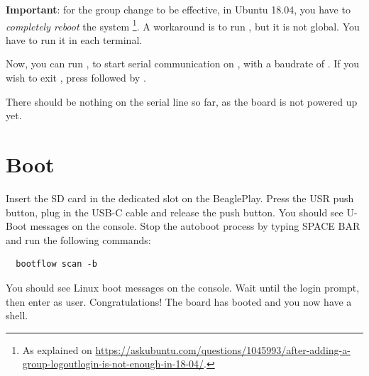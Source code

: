 {\bf Important}: for the group change to be effective, in Ubuntu 18.04, you have to
{\em completely reboot} the system \footnote{As explained on
\url{https://askubuntu.com/questions/1045993/after-adding-a-group-logoutlogin-is-not-enough-in-18-04/}.}.
A workaround is to run , but it is not global.
You have to run it in each terminal.

Now, you can run , to start serial
communication on , with a baudrate of . If
you wish to exit , press \code{[Ctrl][a]} followed by
\code{[Ctrl][x]}.

There should be nothing on the serial line so far, as the board is not
powered up yet.

\section{Boot}

Insert the SD card in the dedicated slot on the BeaglePlay. Press the USR
push button, plug in the USB-C cable and
release the push button. You should see U-Boot messages on the console.
Stop the autoboot process by typing SPACE BAR and run the following commands:

\begin{verbatim}
  bootflow scan -b
\end{verbatim}

You should see Linux boot messages on the console.
Wait until the login prompt, then enter  as user.
Congratulations! The board has booted and you now have a shell.
